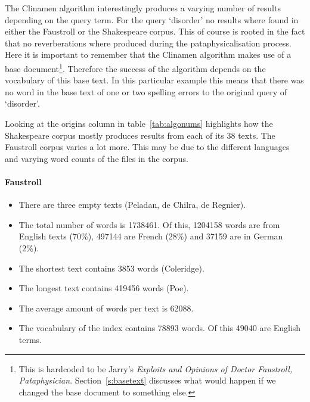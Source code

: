 The Clinamen algorithm interestingly produces a varying number of results depending on the query term. For the query `disorder' no results where found in either the Faustroll or the Shakespeare corpus. This of course is rooted in the fact that no reverberations where produced during the pataphysicalisation process. Here it is important to remember that the Clinamen algorithm makes use of a base document\footnote{This is hardcoded to be Jarry's \textit{Exploits and Opinions of Doctor Faustroll, Pataphysician}. Section~\ref{s:basetext} discusses what would happen if we changed the base document to something else.}. Therefore the success of the algorithm depends on the vocabulary of this base text. In this particular example this means that there was no word in the base text of one or two spelling errors to the original query of `disorder'.

Looking at the origins column in table~\ref{tab:algonums} highlights how the Shakespeare corpus mostly produces results from each of its 38 texts. The Faustroll corpus varies a lot more. This may be due to the different languages and varying word counts of the files in the corpus.

\paragraph*{Faustroll}
\begin{itemize}
  \item There are three empty texts (Peladan, de Chilra, de Regnier).
  \item The total number of words is \num{1738461}. Of this, \num{1204158} words are from English texts (70\%), \num{497144} are French (28\%) and \num{37159} are in German (2\%).
  \item The shortest text contains \num{3853} words (Coleridge).
  \item The longest text contains \num{419456} words (Poe).
  \item The average amount of words per text is \num{62088}.
  \item The vocabulary of the index contains \num{78893} words. Of this \num{49040} are English terms.
\end{itemize}


